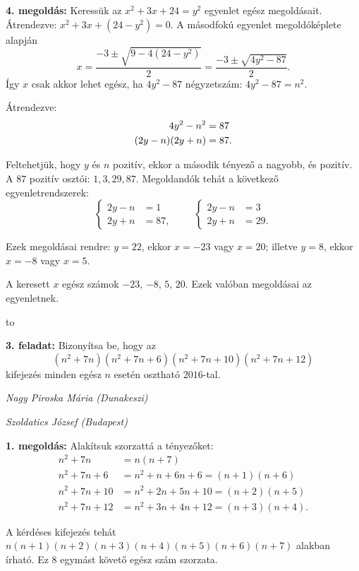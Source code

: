 \documentclass[a4paper,10pt]{article}
\newcommand{\ki}[2]{\hfill {\it #1 (#2)}\medskip}
\newcommand{\vonal}{\hbox to \hsize{\hskip2truecm\hrulefill\hskip2truecm}}
\begin{document}
\medskip

{\bf 4. megoldás: } Keressük az $x^2+3x+24=y^2$ egyenlet egész megoldásait.
Átrendezve: $x^2+3x+(24-y^2)=0$. A másodfokú egyenlet megoldóképlete alapján
\[x=\frac{-3\pm\sqrt{9-4(24-y^2)}}2=\frac{-3\pm\sqrt{4y^2-87}}2.\]
Így $x$ csak akkor lehet egész, ha $4y^2-87$ négyzetszám: $4y^2-87=n^2$.

\smallskip

\noindent Átrendezve: 
\begin{align}
4y^2-n^2&=87\notag\\(2y-n)(2y+n)&=87.
\end{align}

\noindent Feltehetjük, hogy $y$ és $n$ pozitív, ekkor a második tényező a nagyobb, és pozitív. A $87$ pozitív osztói: $1,3,29,87$. Megoldandók tehát a következő egyenletrendszerek:
\[\left\{\begin{aligned}2y-n&=1\\2y+n&=87,\end{aligned}\right.\qquad
\left\{\begin{aligned}2y-n&=3\\2y+n&=29.\end{aligned}\right.\]

\noindent Ezek megoldásai rendre: $y=22$, ekkor $x=-23$ vagy $x=20$; illetve $y=8$, ekkor $x=-8$ vagy $x=5$. 

\noindent A keresett $x$ egész számok $-23$, $-8$, $5$, $20$. Ezek valóban megoldásai az egyenletnek. 

\vonal

{\bf 3. feladat: } Bizonyítsa be, hogy az 
\[(n^2+7n)(n^2+7n+6)(n^2+7n+10)(n^2+7n+12)\] 
kifejezés minden egész $n$ esetén osztható $2016$-tal.


\ki{Nagy Piroska Mária}{Dunakeszi}

\ki{Szoldatics József}{Budapest}\medskip

{\bf 1. megoldás: } Alakítsuk szorzattá a tényezőket: 
\begin{align*}
n^2+7n&=n(n+7)\\
n^2+7n+6&=n^2+n+6n+6=(n+1)(n+6)\\
n^2+7n+10&=n^2+2n+5n+10=(n+2)(n+5)\\
n^2+7n+12&=n^2+3n+4n+12=(n+3)(n+4).
\end{align*}

\noindent A kérdéses kifejezés tehát $n(n+1)(n+2)(n+3)(n+4)(n+5)(n+6)(n+7)$ alakban írható. Ez $8$ egymást követő egész szám szorzata. 

\smallskip
\end{document}
